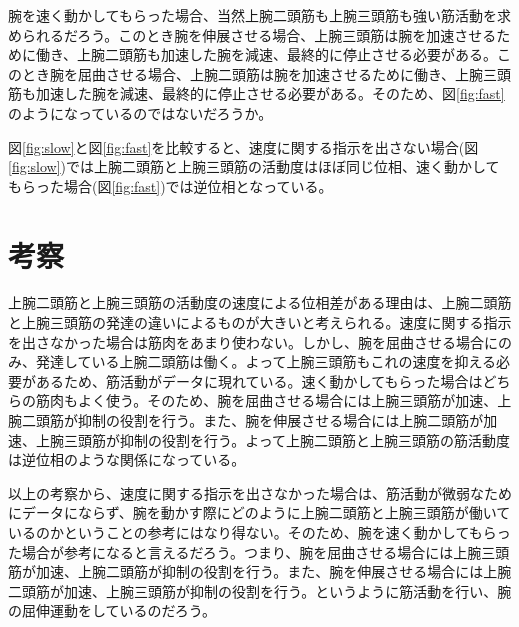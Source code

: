 \documentclass{jsarticle}
\begin{document}
腕を速く動かしてもらった場合、当然上腕二頭筋も上腕三頭筋も強い筋活動を求められるだろう。このとき腕を伸展させる場合、上腕三頭筋は腕を加速させるために働き、上腕二頭筋も加速した腕を減速、最終的に停止させる必要がある。このとき腕を屈曲させる場合、上腕二頭筋は腕を加速させるために働き、上腕三頭筋も加速した腕を減速、最終的に停止させる必要がある。そのため、図\ref{fig:fast}のようになっているのではないだろうか。

図\ref{fig:slow}と図\ref{fig:fast}を比較すると、速度に関する指示を出さない場合(図\ref{fig:slow})では上腕二頭筋と上腕三頭筋の活動度はほぼ同じ位相、速く動かしてもらった場合(図\ref{fig:fast})では逆位相となっている。

\section{考察}
上腕二頭筋と上腕三頭筋の活動度の速度による位相差がある理由は、上腕二頭筋と上腕三頭筋の発達の違いによるものが大きいと考えられる。速度に関する指示を出さなかった場合は筋肉をあまり使わない。しかし、腕を屈曲させる場合にのみ、発達している上腕二頭筋は働く。よって上腕三頭筋もこれの速度を抑える必要があるため、筋活動がデータに現れている。速く動かしてもらった場合はどちらの筋肉もよく使う。そのため、腕を屈曲させる場合には上腕三頭筋が加速、上腕二頭筋が抑制の役割を行う。また、腕を伸展させる場合には上腕二頭筋が加速、上腕三頭筋が抑制の役割を行う。よって上腕二頭筋と上腕三頭筋の筋活動度は逆位相のような関係になっている。

以上の考察から、速度に関する指示を出さなかった場合は、筋活動が微弱なためにデータにならず、腕を動かす際にどのように上腕二頭筋と上腕三頭筋が働いているのかということの参考にはなり得ない。そのため、腕を速く動かしてもらった場合が参考になると言えるだろう。つまり、腕を屈曲させる場合には上腕三頭筋が加速、上腕二頭筋が抑制の役割を行う。また、腕を伸展させる場合には上腕二頭筋が加速、上腕三頭筋が抑制の役割を行う。というように筋活動を行い、腕の屈伸運動をしているのだろう。
\end{document}
